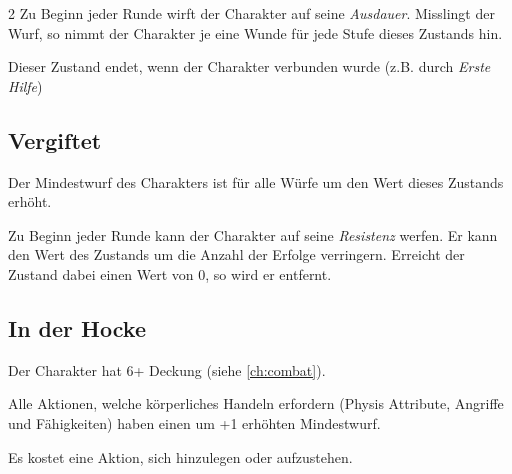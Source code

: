 \begin{multicols}{2}
Zu Beginn jeder Runde wirft der Charakter auf seine \textit{Ausdauer}. Misslingt der Wurf, so nimmt der Charakter je eine Wunde für jede Stufe dieses Zustands hin.

Dieser Zustand endet, wenn der Charakter verbunden wurde (z.B. durch \textit{Erste Hilfe})

\subsection{Vergiftet}

Der Mindestwurf des Charakters ist für alle Würfe um den Wert dieses Zustands erhöht.

Zu Beginn jeder Runde kann der Charakter auf seine \textit{Resistenz} werfen. Er kann den Wert des Zustands um die Anzahl der Erfolge verringern. Erreicht der Zustand dabei einen Wert von 0, so wird er entfernt.

\subsection{In der Hocke}

Der Charakter hat 6+ Deckung (siehe \cref{ch:combat}).

Alle Aktionen, welche körperliches Handeln erfordern (Physis Attribute, Angriffe und Fähigkeiten) haben einen um +1 erhöhten Mindestwurf.

Es kostet eine Aktion, sich hinzulegen oder aufzustehen.
\end{multicols}
